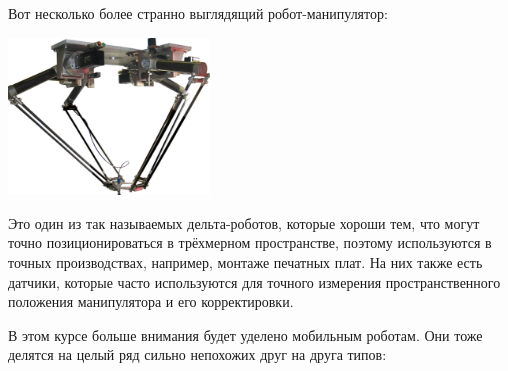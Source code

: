 \documentclass{../../text-style}
\begin{document}
Вот несколько более странно выглядящий робот-манипулятор:

\begin{center}
    \includegraphics[width=0.4\textwidth]{delta.png}
\end{center}

Это один из так называемых дельта-роботов, которые хороши тем, что могут точно позиционироваться в трёхмерном пространстве, поэтому используются в точных производствах, например, монтаже печатных плат.
На них также есть датчики, которые часто используются для точного измерения пространственного положения манипулятора и его корректировки.

В этом курсе больше внимания будет уделено мобильным роботам.
Они тоже делятся на целый ряд сильно непохожих друг на друга типов:
\end{document}
